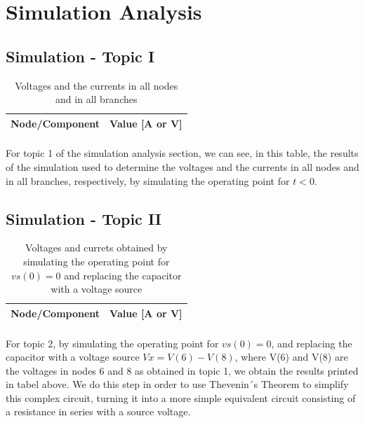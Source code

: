 \section{Simulation Analysis}
\label{sec:simulation}

\subsection{Simulation - Topic I}
\label{subsec:sim_first}

\begin{table}[H] \centering
  \begin{tabular}{|l|r|}
    \hline    
    {\bf Node/Component} & {\bf Value [A or V]} \\ \hline
    
  \end{tabular}
  \caption*{Voltages and the currents in all nodes and in all branches}
 \label{tab:op1}
\end{table}

\paragraph{}
For topic 1 of the simulation analysis section, we can see, in this table, the results of the simulation used to determine the voltages and the currents in all nodes and in all branches, respectively, by simulating the operating point for $t<0$.

\subsection{Simulation - Topic II}
\label{subsec:sim_second}

\begin{table}[H] \centering
  \begin{tabular}{|l|r|}
    \hline    
    {\bf Node/Component} & {\bf Value [A or V]} \\ \hline
    
  \end{tabular}
  \caption*{Voltages and currets obtained by simulating the operating point for $vs(0)=0$ and replacing the capacitor with a voltage source}
 \label{tab:op1}
\end{table}

\paragraph{}
For topic 2, by simulating the operating point for $vs(0)=0$, and replacing the capacitor with a voltage source $Vx = V(6)-V(8)$, where V(6) and V(8) are the voltages in nodes 6 and 8 as obtained in topic 1, we obtain the results printed in tabel above. We do this step in order to use Thevenin´s Theorem to simplify this complex circuit, turning it into a more simple equivalent circuit consisting of a resistance in series with a source voltage.

